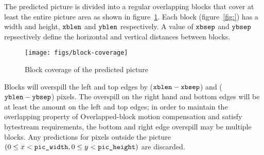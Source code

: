 The predicted picture is divided into a regular overlapping blocks that
cover at least the entire picture area as shown in
figure~\ref{fig:blockcoverage}.  Each block (figure~\ref{fig:}) has a
width and height, $\text{\texttt{xblen}}$ and $\text{\texttt{yblen}}$ respectively.  A value of
$\text{\texttt{xbsep}}$ and
$\text{\texttt{ybsep}}$ repsectively define the horizontal and vertical distances between
blocks.

\begin{figure}[h]
\centering
\texttt{[image: figs/block-coverage]}
\caption{Block coverage of the predicted picture}
\label{fig:blockcoverage}
\end{figure}

Blocks will overspill the left and top edges by ($\text{\texttt{xblen}} - \text{\texttt{xbsep}}$) and
($\text{\texttt{yblen}} - \text{\texttt{ybsep}}$) pixels.  The overspill on the right hand and bottom edges
will be at least the amount on the left and top edges; in order to
maintain the overlapping property of Overlapped-block motion
compensation and satisfy bytestream requirements, the bottom and right
edge overspill may be multiple blocks.  Any predictions for pixels
outside the picture $(0 \leq x < \text{\texttt{pic\_width}}, 0 \leq y < \text{\texttt{pic\_height}})$
are discarded.
